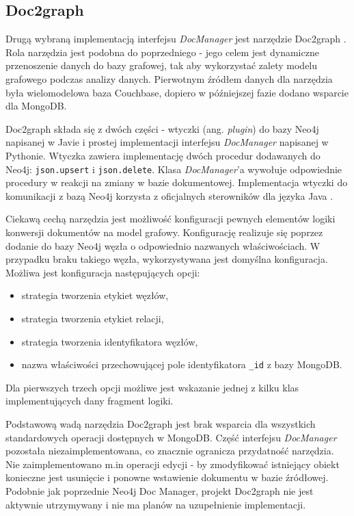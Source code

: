 \documentclass[a4paper,twoside,12pt]{book}
\newcommand{\obcy}[1]{\emph{#1}}
\newcommand{\ang}[1]{{\selectlanguage{british}\obcy{#1}}}
\begin{document}
\subsection{Doc2graph} 

Drugą wybraną implementacją interfejsu \textit{DocManager} jest narzędzie Doc2graph \cite{bib:doc2graph-github}. Rola narzędzia jest podobna do poprzedniego - jego celem jest dynamiczne przenoszenie danych do bazy grafowej, tak aby wykorzystać zalety modelu grafowego podczas analizy danych. Pierwotnym źródłem danych dla narzędzia była wielomodelowa baza Couchbase, dopiero w późniejszej fazie dodano wsparcie dla MongoDB. 

Doc2graph składa się z dwóch części - wtyczki (ang. \ang{plugin}) do bazy Neo4j napisanej w Javie i prostej implementacji interfejsu \textit{DocManager} napisanej w Pythonie. Wtyczka zawiera implementację dwóch procedur dodawanych do Neo4j: \lstinline{json.upsert} i \lstinline{json.delete}. Klasa \textit{DocManager}'a wywołuje odpowiednie procedury w reakcji na zmiany w bazie dokumentowej. Implementacja wtyczki do komunikacji z bazą Neo4j korzysta z oficjalnych sterowników dla języka Java \cite{bib:neo4j-drivers}.

Ciekawą cechą narzędzia jest możliwość konfiguracji pewnych elementów logiki konwersji dokumentów na model grafowy. Konfigurację realizuje się poprzez dodanie do bazy Neo4j węzła o odpowiednio nazwanych właściwościach. W przypadku braku takiego węzła, wykorzystywana jest domyślna konfiguracja. Możliwa jest konfiguracja następujących opcji:

\begin{itemize}
\item strategia tworzenia etykiet węzłów,
\item strategia tworzenia etykiet relacji,
\item strategia tworzenia identyfikatora węzłów,
\item nazwa właściwości przechowującej pole identyfikatora \lstinline{_id} z bazy MongoDB.
\end{itemize}

Dla pierwszych trzech opcji możliwe jest wskazanie jednej z kilku klas implementujących dany fragment logiki. 

Podstawową wadą narzędzia Doc2graph jest brak wsparcia dla wszystkich standardowych operacji dostępnych w MongoDB. Część interfejsu \textit{DocManager} pozostała niezaimplementowana, co znacznie ogranicza przydatność narzędzia. Nie zaimplementowano m.in operacji edycji - by zmodyfikować istniejący obiekt konieczne jest usunięcie i ponowne wstawienie dokumentu w bazie źródłowej. Podobnie jak poprzednie Neo4j Doc Manager, projekt Doc2graph nie jest aktywnie utrzymywany i nie ma planów na uzupełnienie implementacji.
\end{document}
